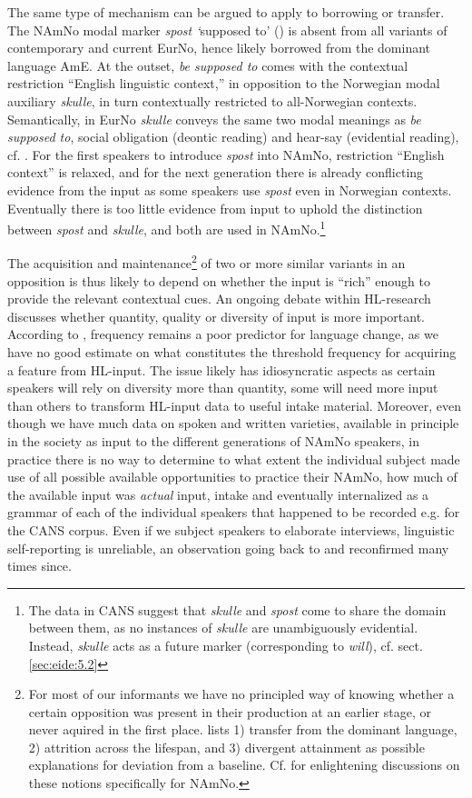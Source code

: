 \documentclass[output=paper]{langscibook}
\begin{document}
The same type of mechanism can be argued to apply to borrowing or transfer. The NAmNo modal marker \textit{spost ‘}supposed to’ (\citealt{EideHjelde2012}) is absent from all variants of contemporary and current EurNo, hence likely borrowed from the dominant language AmE. At the outset, \textit{be supposed to} comes with the contextual restriction “English linguistic context,” in opposition to the Norwegian modal auxiliary \textit{skulle}, in turn contextually restricted to all-Norwegian contexts. Semantically, in EurNo \textit{skulle} conveys the same two modal meanings as \textit{be supposed to}, social obligation (deontic reading) and hear-say (evidential reading), cf. \citet{Eide2005}. For the first speakers to introduce \textit{spost} into NAmNo, restriction “English context” is relaxed, and for the next generation there is already conflicting evidence from the input as some speakers use \textit{spost} even in Norwegian contexts. Eventually there is too little evidence from input to uphold the distinction between \textit{spost} and \textit{skulle}, and both are used in NAmNo.\footnote{The data in CANS suggest that \textit{skulle} and \textit{spost} come to share the domain between them, as no instances of \textit{skulle} are unambiguously evidential. Instead, \textit{skulle} acts as a future marker (corresponding to \textit{will}), cf. sect. \ref{sec:eide:5.2}} 

The acquisition and maintenance\footnote{For most of our informants we have no principled way of knowing whether a certain opposition was present in their production at an earlier stage, or never aquired in the first place. \citet[18]{Polinsky2018} lists 1) transfer from the dominant language, 2) attrition across the lifespan, and 3) divergent attainment as possible explanations for deviation from a baseline. Cf. \citet{Kinn2020} for enlightening discussions on these notions specifically for NAmNo.} of two or more similar variants in an opposition is thus likely to depend on whether the input is “rich” enough to provide the relevant contextual cues. An ongoing debate within HL-research discusses whether quantity, quality or diversity of input is more important. According to \citet{Meisel2011}, frequency remains a poor predictor for language change, as we have no good estimate on what constitutes the threshold frequency for acquiring a feature from HL-input. The issue likely has idiosyncratic aspects as certain speakers will rely on diversity more than quantity, some will need more input than others to transform HL-input data to useful intake material. Moreover, even though we have much data on spoken and written varieties, available in principle in the society as input to the different generations of NAmNo speakers, in practice there is no way to determine to what extent the individual subject made use of all possible available opportunities to practice their NAmNo, how much of the available input was \textit{actual} input, intake and eventually internalized as a grammar of each of the individual speakers that happened to be recorded e.g. for the CANS corpus. Even if we subject speakers to elaborate interviews, linguistic self-reporting is unreliable, an observation going back to \citet{Labov1972} and reconfirmed many times since.
\end{document}
